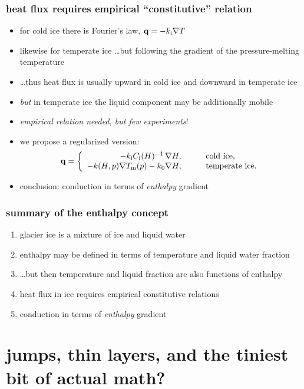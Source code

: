 \documentclass{beamer}
\begin{document}
\begin{frame}
  \frametitle{heat flux requires empirical ``constitutive'' relation}
  
\begin{itemize}
\item for cold ice there is Fourier's law, $\mathbf{q} = - k_{\text i} \nabla T$
\item likewise for temperate ice \dots but following the gradient of the pressure-melting temperature
\item \dots thus heat flux is usually upward in cold ice and downward in temperate ice
\item \emph{but} in temperate ice the liquid component may be additionally mobile
\item \emph{empirical relation needed, but few experiments}!
\item we propose a regularized version:
\begin{equation*}
  {\mathbf q} = \left\{
    \begin{array}{rl}
      - k_{\text i} C_{\text i}(H)^{-1}\, \nabla H, & \qquad \text{cold ice},\\
      - k(H,p) \nabla T_{\text m}(p) - k_0 \nabla H, & \qquad \text{temperate ice}.
    \end{array} 
  \right.
\end{equation*}
\item conclusion: conduction in terms of \emph{enthalpy} gradient
\end{itemize}
\end{frame}



\begin{frame}
  \frametitle{summary of the enthalpy concept}

\begin{enumerate}
\item glacier ice is a mixture of ice and liquid water
\item enthalpy may be defined in terms of temperature and liquid water fraction
\item \dots but then temperature and liquid fraction are also functions of enthalpy
\item heat flux in ice requires empirical constitutive relations
\item conduction in terms of \emph{enthalpy} gradient
\end{enumerate}
\end{frame}


\section[jumps and layers]{jumps, thin layers, and the tiniest bit of actual math?}\subsection*{}
\end{document}
